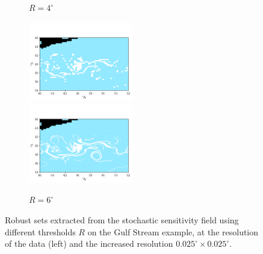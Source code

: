 \begin{figure}
\begin{subfigure}{\textwidth}
		\caption{\(R = 4^\circ\)}
	\end{subfigure}
	\begin{subfigure}{\textwidth}
		\includegraphics[width=0.5\textwidth]{chp06_applications/figures/gulf_stream/S2_robust_grid_6.0}
		\includegraphics[width=0.5\textwidth]{chp06_applications/figures/gulf_stream/S2_robust_high_6.0}
		\caption{\(R = 6^\circ\)}
	\end{subfigure}
	\caption{Robust sets extracted from the stochastic sensitivity field using different thresholds \(R\) on the Gulf Stream example, at the resolution of the data (left) and the increased resolution \(0.025^\circ \times 0.025^\circ\).}
	\label{fig:na_robust_extra}
\end{figure}
